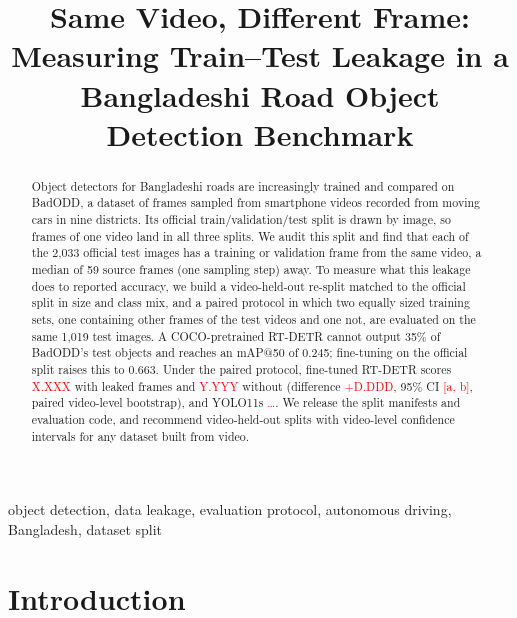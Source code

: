 \documentclass[conference]{IEEEtran}
\newcommand{\TBD}[1]{\textcolor{red}{#1}}   %
\begin{document}
\title{Same Video, Different Frame: Measuring Train--Test Leakage in a Bangladeshi Road Object Detection Benchmark}

\author{\IEEEauthorblockN{\TBD{[Author names --- to be added by the authors]}}
\IEEEauthorblockA{\TBD{[Department, University, City, Country]}\\
\TBD{[email]}}}

\maketitle

\begin{abstract}
Object detectors for Bangladeshi roads are increasingly trained and compared on BadODD, a dataset of frames
sampled from smartphone videos recorded from moving cars in nine districts. Its official
train/validation/test split is drawn by image, so frames of one video land in all three splits. We audit
this split and find that each of the 2,033 official test images has a training or validation frame from the
same video, a median of 59 source frames (one sampling step) away. To measure what this leakage does to
reported accuracy, we build a video-held-out re-split matched to the official split in size and class mix,
and a paired protocol in which two equally sized training sets, one containing other frames of the test
videos and one not, are evaluated on the same 1,019 test images. A COCO-pretrained RT-DETR cannot output
35\% of BadODD's test objects and reaches an mAP@50 of 0.245; fine-tuning on the official split raises this
to 0.663. Under the paired protocol, fine-tuned RT-DETR scores \TBD{X.XXX} with leaked frames and
\TBD{Y.YYY} without (difference \TBD{+D.DDD}, 95\% CI \TBD{[a, b]}, paired video-level bootstrap), and
YOLO11s \TBD{\ldots}. We release the split manifests and evaluation code, and recommend video-held-out
splits with video-level confidence intervals for any dataset built from video.
\end{abstract}

\begin{IEEEkeywords}
object detection, data leakage, evaluation protocol, autonomous driving, Bangladesh, dataset split
\end{IEEEkeywords}

\section{Introduction}
\end{document}
